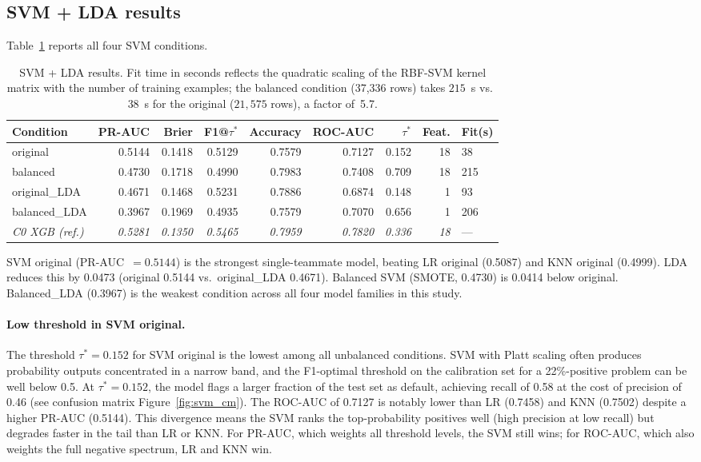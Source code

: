 \documentclass[12pt,a4paper]{article}
\begin{document}
\subsection{SVM + LDA results}

Table~\ref{tab:svm_results} reports all four SVM conditions.

\begin{table}[H]
\centering
\caption{SVM + LDA results. Fit time in seconds reflects the quadratic scaling
         of the RBF-SVM kernel matrix with the number of training examples;
         the balanced condition (37,336 rows) takes $215$~s vs.\ $38$~s for
         the original ($21,575$ rows), a factor of~5.7.}
\label{tab:svm_results}
\small
\begin{tabular}{lrrrrrrrl}
\toprule
Condition & PR-AUC & Brier & F1@$\tau^*$ & Accuracy & ROC-AUC & $\tau^*$ & Feat. & Fit(s) \\
\midrule
original        & 0.5144 & 0.1418 & 0.5129 & 0.7579 & 0.7127 & 0.152 & 18 & 38 \\
balanced        & 0.4730 & 0.1718 & 0.4990 & 0.7983 & 0.7408 & 0.709 & 18 & 215 \\
original\_LDA   & 0.4671 & 0.1468 & 0.5231 & 0.7886 & 0.6874 & 0.148 & 1  & 93 \\
balanced\_LDA   & 0.3967 & 0.1969 & 0.4935 & 0.7579 & 0.7070 & 0.656 & 1  & 206 \\
\midrule
\textit{C0 XGB (ref.)} & \textit{0.5281} & \textit{0.1350} & \textit{0.5465} & \textit{0.7959} & \textit{0.7820} & \textit{0.336} & \textit{18} & — \\
\bottomrule
\end{tabular}
\end{table}

SVM original (PR-AUC~$= 0.5144$) is the strongest single-teammate model,
beating LR original (0.5087) and KNN original (0.4999). LDA reduces this by
0.0473 (original 0.5144 vs.\ original\_LDA 0.4671). Balanced SVM (SMOTE,
0.4730) is 0.0414 below original. Balanced\_LDA (0.3967) is the weakest
condition across all four model families in this study.

\paragraph{Low threshold in SVM original.}
The threshold $\tau^* = 0.152$ for SVM original is the lowest among all
unbalanced conditions. SVM with Platt scaling often produces probability
outputs concentrated in a narrow band, and the F1-optimal threshold on the
calibration set for a 22\%-positive problem can be well below 0.5. At
$\tau^* = 0.152$, the model flags a larger fraction of the test set as
default, achieving recall of 0.58 at the cost of precision of 0.46 (see
confusion matrix Figure~\ref{fig:svm_cm}). The ROC-AUC of 0.7127 is notably
lower than LR (0.7458) and KNN (0.7502) despite a higher PR-AUC (0.5144).
This divergence means the SVM ranks the top-probability positives well
(high precision at low recall) but degrades faster in the tail than LR or
KNN. For PR-AUC, which weights all threshold levels, the SVM still wins; for
ROC-AUC, which also weights the full negative spectrum, LR and KNN win.
\end{document}
